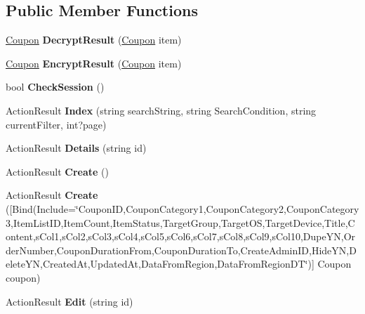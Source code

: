 \subsection*{Public Member Functions}
\begin{DoxyCompactItemize}
\item 
\hyperlink{a00068}{Coupon} {\bfseries Decrypt\+Result} (\hyperlink{a00068}{Coupon} item)\hypertarget{a00071_a0d78b9300023d4d572cccdf5fc272782}{}\label{a00071_a0d78b9300023d4d572cccdf5fc272782}

\item 
\hyperlink{a00068}{Coupon} {\bfseries Encrypt\+Result} (\hyperlink{a00068}{Coupon} item)\hypertarget{a00071_aeac3ad1dcd55d98bac7c27caee440ca4}{}\label{a00071_aeac3ad1dcd55d98bac7c27caee440ca4}

\item 
bool {\bfseries Check\+Session} ()\hypertarget{a00071_ae05fb87ce1e4b4a3b40c12edb26c2813}{}\label{a00071_ae05fb87ce1e4b4a3b40c12edb26c2813}

\item 
Action\+Result {\bfseries Index} (string search\+String, string Search\+Condition, string current\+Filter, int?page)\hypertarget{a00071_a17770c0afe56bfa23bb1feef7f0422f4}{}\label{a00071_a17770c0afe56bfa23bb1feef7f0422f4}

\item 
Action\+Result {\bfseries Details} (string id)\hypertarget{a00071_aba233e999b886228c0f32aeb09956e21}{}\label{a00071_aba233e999b886228c0f32aeb09956e21}

\item 
Action\+Result {\bfseries Create} ()\hypertarget{a00071_ab20df87a2e111f5132be283dfb6218b4}{}\label{a00071_ab20df87a2e111f5132be283dfb6218b4}

\item 
Action\+Result {\bfseries Create} (\mbox{[}Bind(Include=\char`\"{}Coupon\+ID,Coupon\+Category1,Coupon\+Category2,Coupon\+Category3,Item\+List\+ID,Item\+Count,Item\+Status,Target\+Group,Target\+OS,Target\+Device,Title,Content,s\+Col1,s\+Col2,s\+Col3,s\+Col4,s\+Col5,s\+Col6,s\+Col7,s\+Col8,s\+Col9,s\+Col10,Dupe\+YN,Order\+Number,Coupon\+Duration\+From,Coupon\+Duration\+To,Create\+Admin\+ID,Hide\+YN,Delete\+YN,Created\+At,Updated\+At,Data\+From\+Region,Data\+From\+Region\+DT\char`\"{})\mbox{]} Coupon coupon)\hypertarget{a00071_a09a4128160e5af4df99acba3cb1ac868}{}\label{a00071_a09a4128160e5af4df99acba3cb1ac868}

\item 
Action\+Result {\bfseries Edit} (string id)\hypertarget{a00071_a39373b6a5ca168ebb0a343e86d75f317}{}\label{a00071_a39373b6a5ca168ebb0a343e86d75f317}


\end{DoxyCompactItemize}
